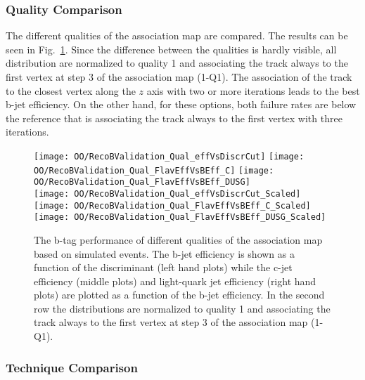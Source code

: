 \subsubsection{Quality Comparison \label{sec:OOBTaggingQual}}

The different qualities of the association map are compared. The results can be seen in Fig.~\ref{plot:OOBTaggingQual}. Since the difference between the qualities is hardly visible, all distribution are normalized to quality 1 and associating the track always to the first vertex at step 3 of the association map (1-Q1). The association of the track to the closest vertex along the $z$ axis with two or more iterations leads to the best b-jet efficiency. On the other hand, for these options, both failure rates are below the reference that is associating the track always to the first vertex with three iterations.

\begin{figure}[h!t]
  \centering
  \texttt{[image: OO/RecoBValidation\_Qual\_effVsDiscrCut]}
  \texttt{[image: OO/RecoBValidation\_Qual\_FlavEffVsBEff\_C]}
  \texttt{[image: OO/RecoBValidation\_Qual\_FlavEffVsBEff\_DUSG]}
  \\
  \texttt{[image: OO/RecoBValidation\_Qual\_effVsDiscrCut\_Scaled]}
  \texttt{[image: OO/RecoBValidation\_Qual\_FlavEffVsBEff\_C\_Scaled]}
  \texttt{[image: OO/RecoBValidation\_Qual\_FlavEffVsBEff\_DUSG\_Scaled]}
  \caption[B tag performance of different qualities based on simulated \ttbar events]{The b-tag performance of different qualities of the association map based on simulated \ttbar events. The b-jet efficiency is shown as a function of the discriminant (left hand plots) while the c-jet efficiency (middle plots) and light-quark jet efficiency (right hand plots) are plotted as a function of the b-jet efficiency. In the second row the distributions are normalized to quality 1 and associating the track always to the first vertex at step 3 of the association map (1-Q1). \label{plot:OOBTaggingQual}}
\end{figure}

\subsubsection{Technique Comparison \label{sec:OOBTaggingComp}}

